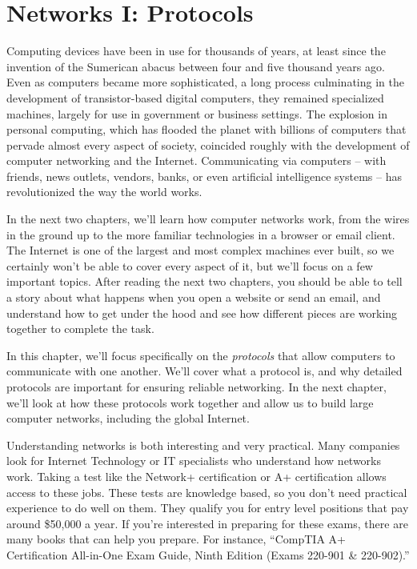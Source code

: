 \chapter{Networks I: Protocols}

Computing devices have been in use for thousands of years, at least since the invention of the Sumerican abacus between four and five thousand years ago. Even as computers became more sophisticated, a long process culminating in the development of transistor-based digital computers, they remained specialized machines, largely for use in government or business settings. The explosion in personal computing, which has flooded the planet with billions of computers that pervade almost every aspect of society, coincided roughly with the development of computer networking and the Internet. Communicating via computers -- with friends, news outlets, vendors, banks, or even artificial intelligence systems -- has revolutionized the way the world works.

In the next two chapters, we'll learn how computer networks work, from the wires in the ground up to the more familiar technologies in a browser or email client. The Internet is one of the largest and most complex machines ever built, so we certainly won't be able to cover every aspect of it, but we'll focus on a few important topics. After reading the next two chapters, you should be able to tell a story about what happens when you open a website or send an email, and understand how to get under the hood and see how different pieces are working together to complete the task.

In this chapter, we'll focus specifically on the \emph{protocols} that allow computers to communicate with one another. We'll cover what a protocol is, and why detailed protocols are important for ensuring reliable networking. In the next chapter, we'll look at how these protocols work together and allow us to build large computer networks, including the global Internet.

Understanding networks is both interesting and very practical. Many companies look for Internet Technology or IT specialists who understand how networks work. Taking a test like the Network+ certification or A+ certification allows access to these jobs. These tests are knowledge based, so you don’t need practical experience to do well on them. They qualify you for entry level positions that pay around \$50,000 a year. If you're interested in preparing for these exams, there are many books that can help you prepare. For instance, ``CompTIA A+ Certification All-in-One Exam Guide, Ninth Edition (Exams 220-901 \& 220-902).''

